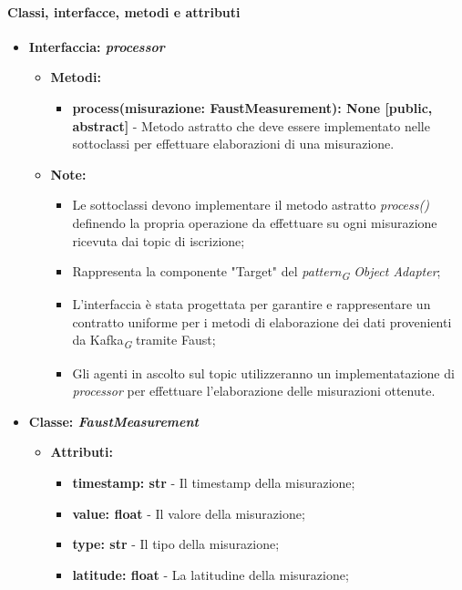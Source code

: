 \paragraph*{Classi, interfacce, metodi e attributi}
\begin{itemize}
    \item{\textbf{Interfaccia: \textit{processor}}}
    \begin{itemize}
    \item\textbf{Metodi: }
    \begin{itemize}
        \item \textbf{process(misurazione: FaustMeasurement): None [public, abstract]} - Metodo astratto che deve essere implementato nelle sottoclassi per effettuare elaborazioni di una misurazione.
    \end{itemize}
    \item\textbf{Note:}
        \begin{itemize}
            \item  Le sottoclassi devono implementare il metodo astratto \textit{process()} definendo la propria operazione da effettuare su ogni misurazione ricevuta dai topic di iscrizione;
            \item Rappresenta la componente "Target" del \textit{pattern}\textsubscript{\textit{G}} \textit{Object Adapter};
            \item L'interfaccia è stata progettata per garantire e rappresentare un contratto uniforme per i metodi di elaborazione dei dati provenienti da Kafka\textsubscript{\textit{G}} tramite Faust;
            \item Gli agenti in ascolto sul topic utilizzeranno un implementatazione di \textit{processor} per effettuare l'elaborazione delle misurazioni ottenute.
        \end{itemize}
    \end{itemize}
    \item{\textbf{Classe: \textit{FaustMeasurement}}}
    \begin{itemize}
    \item\textbf{Attributi:}
        \begin{itemize}
        \item \textbf{timestamp: str} - Il timestamp della misurazione;
        \item \textbf{value: float} - Il valore della misurazione;
        \item \textbf{type: str} - Il tipo della misurazione;
        \item \textbf{latitude: float} - La latitudine della misurazione;

\end{itemize}
\end{itemize}
\end{itemize}
